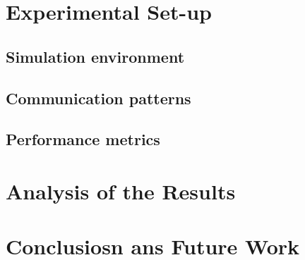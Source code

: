 \documentclass{sig-alternate}
\begin{document}
\section{Experimental Set-up}
\label{experimental}

\subsection{Simulation environment}
\label{subsec:simulation}


\subsection{Communication patterns}
\label{subsec:communication}

\subsection{Performance metrics}
\label{subsec:performance}


\section{Analysis of the Results}
\label{analysis}

\section{Conclusiosn ans Future Work}
\label{conclusions}




\end{document}
